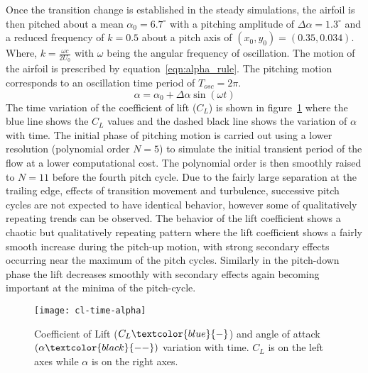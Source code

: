 Once the transition change is established in the steady simulations, the airfoil is then pitched about a mean $\alpha_{0}=6.7^{\circ}$ with a pitching amplitude of $\Delta\alpha=1.3^{\circ}$ and a reduced frequency of $k=0.5$ about a pitch axis of $(x_{0},y_{0})=(0.35,0.034)$. Where, $k=\frac{\omega c}{2U_{0}}$ with $\omega$ being the angular frequency of oscillation. The motion of the airfoil is prescribed by equation~\ref{eqn:alpha_rule}. The pitching motion corresponds to an oscillation time period of $T_{osc}=2\pi$.
\begin{equation}
\alpha = \alpha_{0} + \Delta\alpha\sin(\omega t)
\label{eqn:alpha_rule}
\end{equation}
The time variation of the coefficient of lift ($C_{L}$) is shown in figure~\ref{fig:cl-time-alpha} where the blue line shows the $C_{L}$ values and the dashed black line shows the variation of $\alpha$ with time. The initial phase of pitching motion is carried out using a lower resolution (polynomial order $N=5$) to simulate the initial transient period of the flow at a lower computational cost. The polynomial order is then smoothly raised to $N=11$ before the fourth pitch cycle. Due to the fairly large separation at the trailing edge, effects of transition movement and turbulence, successive pitch cycles are not expected to have identical behavior, however some of qualitatively repeating trends can be observed. The behavior of the lift coefficient shows a chaotic but qualitatively repeating pattern where the lift coefficient shows a fairly smooth increase during the pitch-up motion, with strong secondary effects occurring near the maximum of the pitch cycles. Similarly in the pitch-down phase the lift decreases smoothly with secondary effects again becoming important at the minima of the pitch-cycle.
\begin{figure}[h]
		\centering
		\texttt{[image: cl-time-alpha]}
		\caption{Coefficient of Lift ($C_{L} \textcolor{blue}{-}$) and angle of attack $(\alpha \textcolor{black}{--})$ variation with time. $C_{L}$ is on the left axes while $\alpha$ is on the right axes.}
		\label{fig:cl-time-alpha}
\end{figure}

